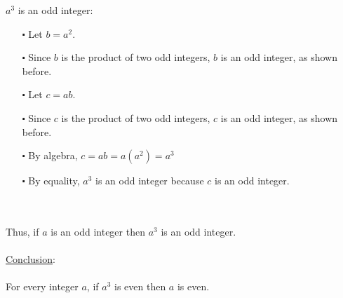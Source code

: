 \documentclass[12pt]{article}
\begin{document}
$a^3$ is an odd integer:
\begin{itemize}
  \item [$\centerdot$] Let $b = a^2$.
  \item [$\centerdot$] Since $b$ is the product of two odd integers, $b$ is an odd integer, as shown before.
  \item [$\centerdot$] Let $c = ab$.
  \item [$\centerdot$] Since $c$ is the product of two odd integers, $c$ is an odd integer, as shown before.
  \item [$\centerdot$] By algebra, $c = ab = a(a^2) = a^3$
  \item [$\centerdot$] By equality, $a^3$ is an odd integer because $c$ is an odd integer.
\end{itemize}
\newblock
\\ \\
Thus, if $a$ is an odd integer then $a^3$ is an odd integer.
\\ \\
\underline{Conclusion}:
\\ \\
For every integer $a$, if $a^3$ is even then $a$ is even.
\end{document}
